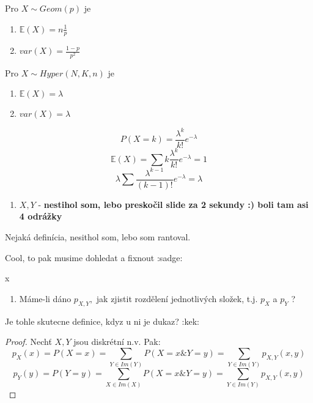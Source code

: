 \documentclass[../main.tex]{subfiles}
\begin{document}
\begin{theorem}
    Pro $X\sim Geom(p)$ je
    \begin{enumerate}
        \item $\mathbb{E}(X) = n\frac{1}{p}$
        \item $var(X) = \frac{1-p}{p^2}$
    \end{enumerate}
\end{theorem}

\begin{theorem}
    Pro $X\sim Hyper(N,K,n)$ je
    \begin{enumerate}
        \item $\mathbb{E}(X) = \lambda$
        \item $var(X) = \lambda$
    \end{enumerate}
    \[P(X=k) = \frac{\lambda^k}{k!}e^{-\lambda}\]
    \[\mathbb{E}(X) = \sum k \frac{\lambda^k}{k!}e^{-\lambda} = 1\]
    \[\lambda \sum \frac{\lambda^{k-1}}{(k-1)!}e^{-\lambda} = \lambda\]    
\end{theorem}

\begin{definition}
    \begin{enumerate}
        \item $X,Y$ - \textbf{nestihol som, lebo preskočil slide za 2 sekundy :) boli tam asi 4 odrážky}
    \end{enumerate}
\end{definition}

\begin{definition}
    Nejaká definícia, nesithol som, lebo som rantoval.

    Cool, to pak musime dohledat a fixnout :sadge:
\end{definition}

\begin{definition}
    {\color{white} x}
    
    \begin{enumerate}
        \item Máme-li dáno $p_{X,Y},$ jak zjistit rozdělení jednotlivých složek, t.j. $p_X$ a $p_Y$ ?
    \end{enumerate}

    Je tohle skutecne definice, kdyz u ni je dukaz? :kek:
\end{definition}
\begin{proof}
    Nechť $X,Y$ jsou diskrétní n.v. Pak:
    \[p_X(x) = P(X=x) = \sum_{Y\in Im(Y)} P(X = x \& Y=y) = \sum_{Y\in Im(Y)} p_{X,Y}(x,y)\]
    \[p_Y(y) = P(Y=y) = \sum_{X\in Im(X)} P(X = x \& Y=y) = \sum_{Y\in Im(Y)} p_{X,Y}(x,y)\]
\end{proof}
\end{document}
